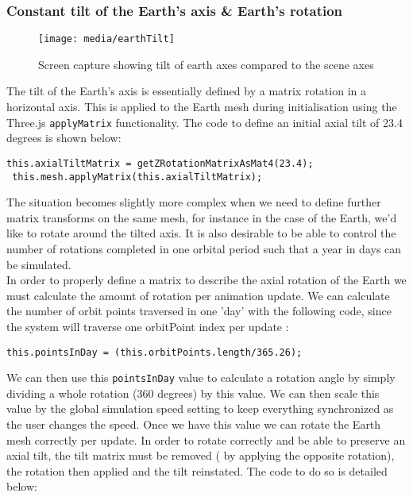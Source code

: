 \documentclass[titlepage]{article}
\begin{document}
\subsubsection{Constant tilt of the Earth’s axis \& Earth's rotation}

\begin{figure}[h!]
                \centering
                \texttt{[image: media/earthTilt]}
                \caption{Screen capture showing tilt of earth axes compared to the scene axes}
\end{figure}

The tilt of the Earth's axis is essentially defined by a matrix rotation in a horizontal axis. This is applied to the Earth mesh during initialisation using the Three.js \texttt{applyMatrix} functionality. The code to define an initial axial tilt of 23.4 degrees is shown below:
\begin{lstlisting}[caption=Code taken from Earth.js]
this.axialTiltMatrix = getZRotationMatrixAsMat4(23.4);
 this.mesh.applyMatrix(this.axialTiltMatrix);
\end{lstlisting}


The situation becomes slightly more complex when we need to define further matrix transforms on the same mesh, for instance in the case of the Earth, we'd like to rotate around the tilted axis. It is also desirable to be able to control the number of rotations completed in one orbital period such that a year in days can be simulated.
\\ 
In order to properly define a matrix to describe the axial rotation of the Earth we must calculate the amount of rotation per animation update. We can calculate the number of orbit points traversed in one 'day' with the following code, since the system will traverse one orbitPoint index per update :

\begin{lstlisting}[caption=Code taken from Earth.js]
 this.pointsInDay = (this.orbitPoints.length/365.26);
\end{lstlisting}
We can then use this \texttt{pointsInDay} value to calculate a rotation angle by simply dividing a whole rotation (360 degrees) by this value. We can then scale this value by the global simulation speed setting to keep everything synchronized as the user changes the speed. Once we have this value we can rotate the Earth mesh correctly per update. In order to rotate correctly and be able to preserve an axial tilt, the tilt matrix must be removed ( by applying the opposite rotation), the rotation then applied and the tilt reinstated. The code to do  so is detailed below:
\end{document}
